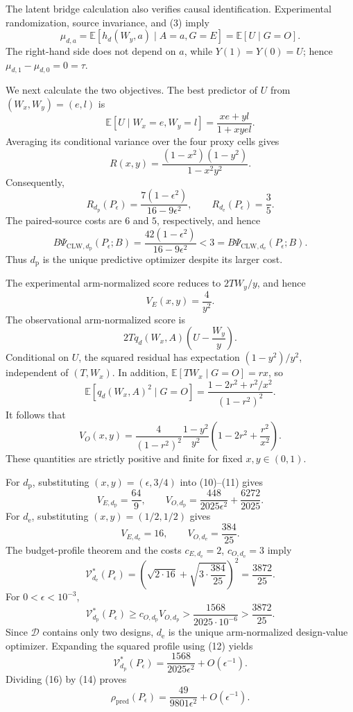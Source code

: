 The latent bridge calculation also verifies causal identification. Experimental randomization, source invariance, and (3) imply
\[
 \mu_{d,a}=\mathbb E[h_d(W_y,a)\mid A=a,G=E]
 =\mathbb E[U\mid G=O].                                    \tag{6}
\]
The right-hand side does not depend on \(a\), while \(Y(1)=Y(0)=U\); hence \(\mu_{d,1}-\mu_{d,0}=0=\tau\).

We next calculate the two objectives. The best predictor of \(U\) from \((W_x,W_y)=(e,l)\) is
\[
 \mathbb E[U\mid W_x=e,W_y=l]=\frac{xe+yl}{1+xyel}.
\]
Averaging its conditional variance over the four proxy cells gives
\[
 R(x,y)=\frac{(1-x^2)(1-y^2)}{1-x^2y^2}.                   \tag{7}
\]
Consequently,
\[
 R_{d_{\mathrm p}}(P_\epsilon)
 =\frac{7(1-\epsilon^2)}{16-9\epsilon^2},
 \qquad
 R_{d_{\mathrm e}}(P_\epsilon)=\frac35.                   \tag{8}
\]
The paired-source costs are \(6\) and \(5\), respectively, and hence
\[
 B\Psi_{\mathrm{CLW},d_{\mathrm p}}(P_\epsilon;B)
 =\frac{42(1-\epsilon^2)}{16-9\epsilon^2}
 <3
 =B\Psi_{\mathrm{CLW},d_{\mathrm e}}(P_\epsilon;B).       \tag{9}
\]
Thus \(d_{\mathrm p}\) is the unique predictive optimizer despite its larger cost.

The experimental arm-normalized score reduces to \(2TW_y/y\), and hence
\[
 V_E(x,y)=\frac4{y^2}.                                      \tag{10}
\]
The observational arm-normalized score is
\[
 2Tq_d(W_x,A)\left(U-\frac{W_y}{y}\right).
\]
Conditional on \(U\), the squared residual has expectation \((1-y^2)/y^2\), independent of \((T,W_x)\). In addition, \(\mathbb E[TW_x\mid G=O]=rx\), so
\[
 \mathbb E[q_d(W_x,A)^2\mid G=O]
 =\frac{1-2r^2+r^2/x^2}{(1-r^2)^2}.
\]
It follows that
\[
 V_O(x,y)=
 \frac4{(1-r^2)^2}\frac{1-y^2}{y^2}
 \left(1-2r^2+\frac{r^2}{x^2}\right).                     \tag{11}
\]
These quantities are strictly positive and finite for fixed \(x,y\in(0,1)\).

For \(d_{\mathrm p}\), substituting \((x,y)=(\epsilon,3/4)\) into (10)--(11) gives
\[
 V_{E,d_{\mathrm p}}=\frac{64}{9},
 \qquad
 V_{O,d_{\mathrm p}}
 =\frac{448}{2025\epsilon^2}+\frac{6272}{2025}.            \tag{12}
\]
For \(d_{\mathrm e}\), substituting \((x,y)=(1/2,1/2)\) gives
\[
 V_{E,d_{\mathrm e}}=16,
 \qquad
 V_{O,d_{\mathrm e}}=\frac{384}{25}.                       \tag{13}
\]
The budget-profile theorem and the costs \(c_{E,d_{\mathrm e}}=2\), \(c_{O,d_{\mathrm e}}=3\) imply
\[
 \mathcal V_{d_{\mathrm e}}^*(P_\epsilon)
 =\left(\sqrt{2\cdot16}+\sqrt{3\cdot\frac{384}{25}}\right)^2
 =\frac{3872}{25}.                                         \tag{14}
\]
For \(0<\epsilon<10^{-3}\),
\[
 \mathcal V_{d_{\mathrm p}}^*(P_\epsilon)
 \ge c_{O,d_{\mathrm p}}V_{O,d_{\mathrm p}}
 >\frac{1568}{2025\cdot10^{-6}}
 >\frac{3872}{25}.                                         \tag{15}
\]
Since \(\mathcal D\) contains only two designs, \(d_{\mathrm e}\) is the unique arm-normalized design-value optimizer. Expanding the squared profile using (12) yields
\[
 \mathcal V_{d_{\mathrm p}}^*(P_\epsilon)
 =\frac{1568}{2025\epsilon^2}+O(\epsilon^{-1}).            \tag{16}
\]
Dividing (16) by (14) proves
\[
 \rho_{\mathrm{pred}}(P_\epsilon)
 =\frac{49}{9801\epsilon^2}+O(\epsilon^{-1}).              \tag{17}
\]

